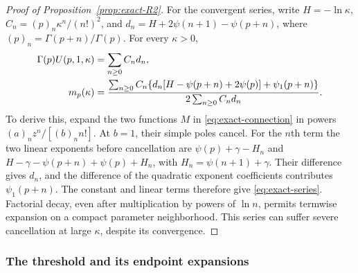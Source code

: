 \begin{proof}[Proof of Proposition~\ref{prop:exact-R2}]
For the convergent series, write $H=-\ln\kappa$, $C_n=(p)_n\kappa^n/(n!)^2$, and $d_n=H+2\psi(n+1)-\psi(p+n)$, where $(p)_n=\Gamma(p+n)/\Gamma(p)$. For every $\kappa>0$,
\begin{align}
 \Gamma(p)U(p,1,\kappa)&=\sum_{n\geq0}C_nd_n,\notag\\
 m_p(\kappa)&=
 \frac{\sum_{n\geq0}C_n\{d_n[H-\psi(p+n)+2\psi(p)]+\psi_1(p+n)\}}
 {2\sum_{n\geq0}C_nd_n}.
 \label{eq:exact-series}
\end{align}
To derive this, expand the two functions $M$ in \eqref{eq:exact-connection} in powers $(a)_nz^n/[(b)_nn!]$. At $b=1$, their simple poles cancel. For the $n$th term the two linear exponents before cancellation are $\psi(p)+\gamma-H_n$ and $H-\gamma-\psi(p+n)+\psi(p)+H_n$, with $H_n=\psi(n+1)+\gamma$. Their difference gives $d_n$, and the difference of the quadratic exponent coefficients contributes $\psi_1(p+n)$. The constant and linear terms therefore give \eqref{eq:exact-series}. Factorial decay, even after multiplication by powers of $\ln n$, permits termwise expansion on a compact parameter neighborhood. This series can suffer severe cancellation at large $\kappa$, despite its convergence.
\end{proof}

\subsubsection{The threshold and its endpoint expansions}

